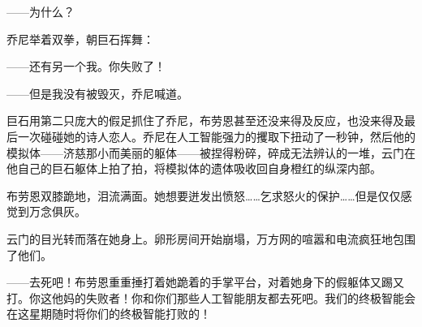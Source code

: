 \documentclass[AutoFakeBold=true]{book}
\begin{document}
{\kaishu ——为什么？}

{}

\vspace*{1em}

乔尼举着双拳，朝巨石挥舞：

{\kaishu ——还有另一个我。你失败了！}

{}

{\kaishu ——但是我没有被毁灭}，乔尼喊道。

{}

巨石用第二只庞大的假足抓住了乔尼，布劳恩甚至还没来得及反应，也没来得及最后一次碰碰她的诗人恋人。乔尼在人工智能强力的攫取下扭动了一秒钟，然后他的模拟体——济慈那小而美丽的躯体——被捏得粉碎，碎成无法辨认的一堆，云门在他自己的巨石躯体上拍了拍，将模拟体的遗体吸收回自身橙红的纵深内部。

布劳恩双膝跪地，泪流满面。她想要迸发出愤怒……乞求怒火的保护……但是仅仅感觉到万念俱灰。

云门的目光转而落在她身上。卵形房间开始崩塌，万方网的喧嚣和电流疯狂地包围了他们。

{}

{\kaishu ——去死吧！}布劳恩重重捶打着她跪着的手掌平台，对着她身下的假躯体又踢又打。{\kaishu 你这他妈的失败者！你和你们那些人工智能朋友都去死吧。我们的终极智能会在这星期随时将你们的终极智能打败的！}
\end{document}
